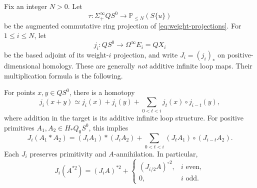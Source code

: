 Fix an integer $N>0$.  Let
\[
 \tau:\Sigma^\infty_+QS^0\longrightarrow\mathbb P_{\leq N}(S\{u\})
\]
be the augmented commutative ring projection of
\eqref{eq:weight-projections}.  For $1\leq i\leq N$, let
\[
 j_i:QS^0\longrightarrow\Omega^\infty E_i=QX_i
\]
be the based adjoint of its weight-$i$ projection, and write
$J_i=(j_i)_*$ on positive-dimensional homology.  These are generally
\emph{not} additive infinite loop maps.  Their multiplication formula
is the following.

\begin{lemma}
\label{lem:weight-product}
For points $x,y\in QS^0$, there is a homotopy
\begin{equation}
\label{eq:weight-product}
 j_i(x+y)\simeq j_i(x)+j_i(y)
       +\sum_{0<t<i}j_t(x)\circ j_{i-t}(y),
\end{equation}
where addition in the target is its additive infinite loop structure.
For positive primitives $A_1,A_2\in H_*Q_0S^0$, this implies
\begin{equation}
\label{eq:primitive-weight-product}
 J_i(A_1*A_2)
 =(J_iA_1)*(J_iA_2)
   +\sum_{0<t<i}(J_tA_1)\circ(J_{i-t}A_2).
\end{equation}
Each $J_i$ preserves primitivity and $A$-annihilation.  In particular,
\begin{equation}
\label{eq:weight-square}
 J_i(A^{*2})=(J_iA)^{*2}
 +\begin{cases}(J_{i/2}A)^{\circ2},&i\text{ even},\\0,&i\text{ odd}.
 \end{cases}
\end{equation}
\end{lemma}

